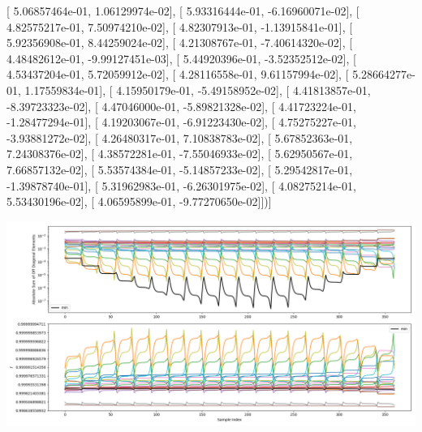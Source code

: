 \documentclass{article}
\begin{document}
       [  5.06857464e-01,   1.06129974e-02],
       [  5.93316444e-01,  -6.16960071e-02],
       [  4.82575217e-01,   7.50974210e-02],
       [  4.82307913e-01,  -1.13915841e-01],
       [  5.92356908e-01,   8.44259024e-02],
       [  4.21308767e-01,  -7.40614320e-02],
       [  4.48482612e-01,  -9.99127451e-03],
       [  5.44920396e-01,  -3.52352512e-02],
       [  4.53437204e-01,   5.72059912e-02],
       [  4.28116558e-01,   9.61157994e-02],
       [  5.28664277e-01,   1.17559834e-01],
       [  4.15950179e-01,  -5.49158952e-02],
       [  4.41813857e-01,  -8.39723323e-02],
       [  4.47046000e-01,  -5.89821328e-02],
       [  4.41723224e-01,  -1.28477294e-01],
       [  4.19203067e-01,  -6.91223430e-02],
       [  4.75275227e-01,  -3.93881272e-02],
       [  4.26480317e-01,   7.10838783e-02],
       [  5.67852363e-01,   7.24308376e-02],
       [  4.38572281e-01,  -7.55046933e-02],
       [  5.62950567e-01,   7.66857132e-02],
       [  5.53574384e-01,  -5.14857233e-02],
       [  5.29542817e-01,  -1.39878740e-01],
       [  5.31962983e-01,  -6.26301975e-02],
       [  4.08275214e-01,   5.53430196e-02],
       [  4.06595899e-01,  -9.77270650e-02]])]
\begin{center}
\includegraphics[scale=.9]{report_pickled_controls230/control_dpn_all.png}

\end{center}
\end{document}
